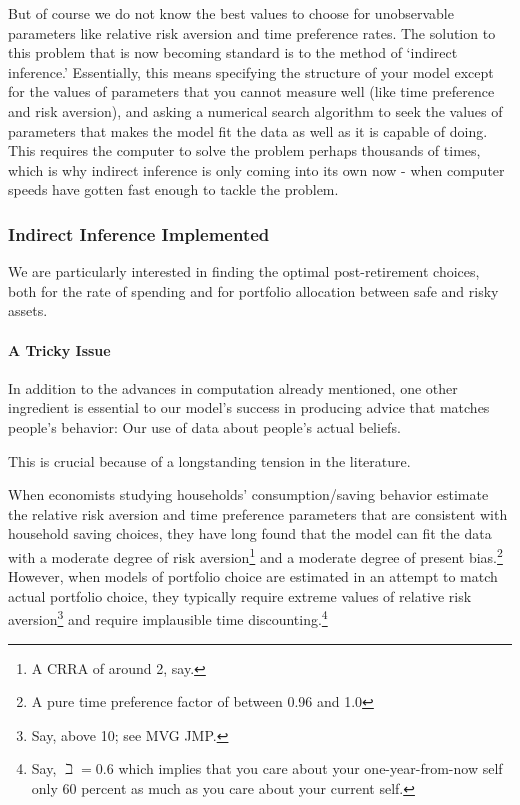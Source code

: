 \documentclass{article}
\begin{document}
But of course we do not know the best values to choose for unobservable parameters like relative risk aversion and time preference rates. The solution to this problem that is now becoming standard is to the method of `indirect inference.' Essentially, this means specifying the structure of your model except for the values of parameters that you cannot measure well (like time preference and risk aversion), and asking a numerical search algorithm to seek the values of parameters that makes the model fit the data as well as it is capable of doing. This requires the computer to solve the problem perhaps thousands of times, which is why indirect inference is only coming into its own now - when computer speeds have gotten fast enough to tackle the problem.

\subsubsection{Indirect Inference Implemented}

We are particularly interested in finding the optimal post-retirement choices, both for the rate of spending and for portfolio allocation between safe and risky assets.

\paragraph{A Tricky Issue}

In addition to the advances in computation already mentioned, one other ingredient is essential to our model's success in producing advice that matches people's behavior: Our use of data about people's actual beliefs.

This is crucial because of a longstanding tension in the literature.

When economists studying households' consumption/saving behavior estimate the relative risk aversion and time preference parameters that are consistent with household saving choices, they have long found that the model can fit the data with a moderate degree of risk aversion\footnote{A CRRA of around 2, say.} and a moderate degree of present bias.\footnote{A pure time preference factor of between 0.96 and 1.0} However, when models of portfolio choice are estimated in an attempt to match actual portfolio choice, they typically require extreme values of relative risk aversion\footnote{Say, above 10; see MVG JMP.} and require implausible time discounting.\footnote{Say, $\beth = 0.6$ which implies that you care about your one-year-from-now self only 60 percent as much as you care about your current self.}
\end{document}
